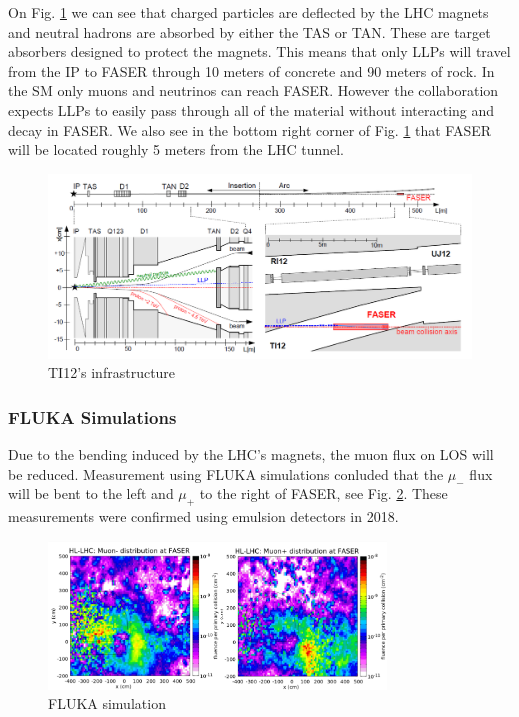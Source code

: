 On Fig. \ref{fig:infrastructure} we can see that charged particles are deflected by the LHC magnets and neutral hadrons are absorbed by either the TAS or TAN. These are target absorbers designed to protect the magnets. This means that only LLPs will travel from the IP to FASER through 10 meters of concrete and 90 meters of rock. In the SM only muons and neutrinos can reach FASER. However the collaboration expects LLPs to easily pass through all of the material without interacting and decay in FASER. We also see in the bottom right corner of Fig. \ref{fig:infrastructure} that FASER will be located roughly 5 meters from the LHC tunnel.

\begin{figure}[htbp!] 
\centering    
\includegraphics[width=1.0\textwidth]{FASERinfrastructureTI12.png}
\caption[TI12 infrastructure]{TI12's infrastructure}
\label{fig:infrastructure}
\end{figure}

\subsubsection{FLUKA Simulations}

Due to the bending induced by the LHC's magnets, the muon flux on LOS will be reduced. Measurement using FLUKA simulations conluded that the $\mu_{-}$ flux will be bent to the left and $\mu_{+}$ to the right of FASER, see Fig. \ref{fig:FLUKA}. These measurements were confirmed using emulsion detectors in 2018.

\begin{figure}[htbp!] 
\centering    
\includegraphics[width=0.8\textwidth]{FLUKA.png}
\caption[FLUKA]{FLUKA simulation}
\label{fig:FLUKA}
\end{figure}

